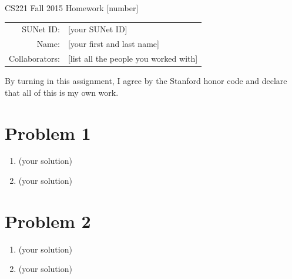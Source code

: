\documentclass[12pt]{article}
\begin{document}
\begin{center}
{\Large CS221 Fall 2015 Homework [number]}

\begin{tabular}{rl}
SUNet ID: & [your SUNet ID] \\
Name: & [your first and last name] \\
Collaborators: & [list all the people you worked with]
\end{tabular}
\end{center}

By turning in this assignment, I agree by the Stanford honor code and declare
that all of this is my own work.

\section*{Problem 1}

\begin{enumerate}[label=(\alph*)]
  \item (your solution)
  \item (your solution)
\end{enumerate}

\section*{Problem 2}

\begin{enumerate}[label=(\alph*)]
  \item (your solution)
  \item (your solution)
\end{enumerate}
\end{document}
